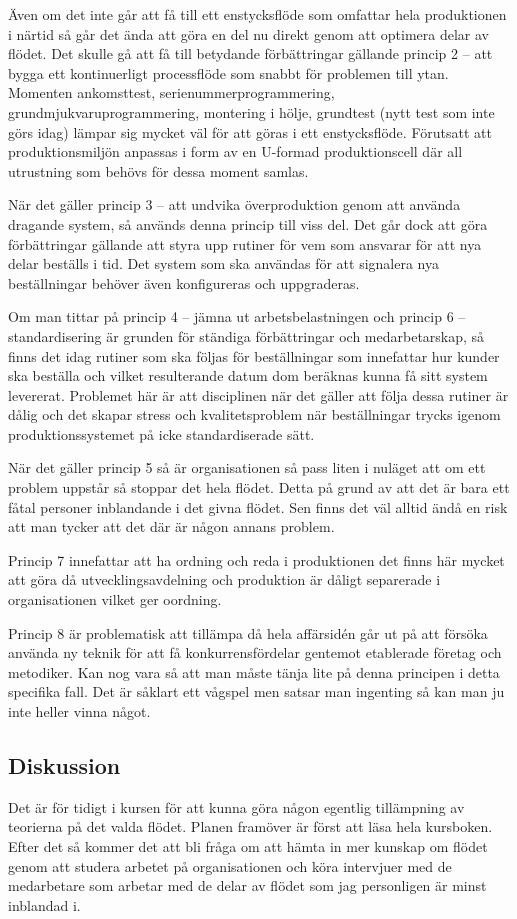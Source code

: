 \documentclass{article}
\begin{document}
Även om det inte går att få till ett enstycksflöde som omfattar hela produktionen i närtid så går det ända att göra en del nu direkt genom att optimera delar av flödet. Det skulle gå att få till betydande förbättringar gällande princip 2 -- att bygga ett kontinuerligt processflöde som snabbt för problemen till ytan. Momenten ankomsttest, serienummerprogrammering, grundmjukvaruprogrammering, montering i hölje, grundtest (nytt test som inte görs idag) lämpar sig mycket väl för att göras i ett enstycksflöde. Förutsatt att produktionsmiljön anpassas i form av en U-formad produktionscell där all utrustning som behövs för dessa moment samlas.

När det gäller princip 3 -- att undvika överproduktion genom att använda dragande system, så används denna princip till viss del. Det går dock att göra förbättringar gällande att styra upp rutiner för vem som ansvarar för att nya delar beställs i tid. Det system som ska användas för att signalera nya beställningar behöver även konfigureras och uppgraderas.

Om man tittar på princip 4 -- jämna ut arbetsbelastningen och princip 6 -- standardisering är grunden för ständiga förbättringar och medarbetarskap, så finns det idag rutiner som ska följas för beställningar som innefattar hur kunder ska beställa och vilket resulterande datum dom beräknas kunna få sitt system levererat. Problemet här är att disciplinen när det gäller att följa dessa rutiner är dålig och det skapar stress och kvalitetsproblem när beställningar trycks igenom produktionssystemet på icke standardiserade sätt.

När det gäller princip 5 så är organisationen så pass liten i nuläget att om ett problem uppstår så stoppar det hela flödet. Detta på grund av att det är bara ett fåtal personer inblandande i det givna flödet. Sen finns det väl alltid ändå en risk att man tycker att det där är någon annans problem.

Princip 7 innefattar att ha ordning och reda i produktionen det finns här mycket att göra då utvecklingsavdelning och produktion är dåligt separerade i organisationen vilket ger oordning.

Princip 8 är problematisk att tillämpa då hela affärsidén går ut på att försöka använda ny teknik för att få konkurrensfördelar gentemot etablerade företag och metodiker. Kan nog vara så att man måste tänja lite på denna principen i detta specifika fall. Det är såklart ett vågspel men satsar man ingenting så kan man ju inte heller vinna något.

\subsection*{Diskussion}
Det är för tidigt i kursen för att kunna göra någon egentlig tillämpning av teorierna på det valda flödet. Planen framöver är först att läsa hela kursboken. Efter det så kommer det att bli fråga om att hämta in mer kunskap om flödet genom att studera arbetet på organisationen och köra intervjuer med de medarbetare som arbetar med de delar av flödet som jag personligen är minst inblandad i.
\end{document}
